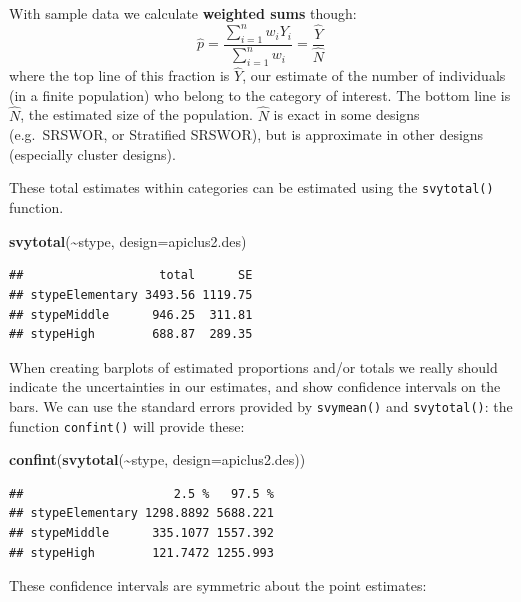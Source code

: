 \documentclass[
]{book}
\newenvironment{Shaded}{\begin{snugshade}}{\end{snugshade}}
\newcommand{\AttributeTok}[1]{\textcolor[rgb]{0.13,0.29,0.53}{#1}}
\newcommand{\FunctionTok}[1]{\textcolor[rgb]{0.13,0.29,0.53}{\textbf{#1}}}
\newcommand{\NormalTok}[1]{#1}
\newcommand{\SpecialCharTok}[1]{\textcolor[rgb]{0.81,0.36,0.00}{\textbf{#1}}}
\begin{document}
With sample data we calculate \textbf{weighted sums} though:
\[
   \widehat{p} = \frac{\sum_{i=1}^n w_i Y_i}{\sum_{i=1}^n w_i} = \frac{\widehat{Y}}{\widehat{N}}
\]
where the top line of this fraction is \(\widehat{Y}\), our estimate of the
number of individuals (in a finite population) who belong to the category of
interest. The bottom line is \(\widehat{N}\), the estimated size of the population.
\(\widehat{N}\) is exact in some designs (e.g.~SRSWOR, or Stratified SRSWOR), but
is approximate in other designs (especially cluster designs).

These total estimates within categories can be estimated using the \texttt{svytotal()}
function.

\begin{Shaded}
\begin{Highlighting}[]
\FunctionTok{svytotal}\NormalTok{(}\SpecialCharTok{\textasciitilde{}}\NormalTok{stype, }\AttributeTok{design=}\NormalTok{apiclus2.des)}
\end{Highlighting}
\end{Shaded}

\begin{verbatim}
##                   total      SE
## stypeElementary 3493.56 1119.75
## stypeMiddle      946.25  311.81
## stypeHigh        688.87  289.35
\end{verbatim}

When creating barplots of estimated proportions and/or totals
we really should indicate the uncertainties in our
estimates, and show confidence intervals on the bars. We can use the standard
errors provided by \texttt{svymean()} and \texttt{svytotal()}: the function \texttt{confint()}
will provide these:

\begin{Shaded}
\begin{Highlighting}[]
\FunctionTok{confint}\NormalTok{(}\FunctionTok{svytotal}\NormalTok{(}\SpecialCharTok{\textasciitilde{}}\NormalTok{stype, }\AttributeTok{design=}\NormalTok{apiclus2.des))}
\end{Highlighting}
\end{Shaded}

\begin{verbatim}
##                     2.5 %   97.5 %
## stypeElementary 1298.8892 5688.221
## stypeMiddle      335.1077 1557.392
## stypeHigh        121.7472 1255.993
\end{verbatim}

These confidence intervals are symmetric about the point estimates:
\end{document}
